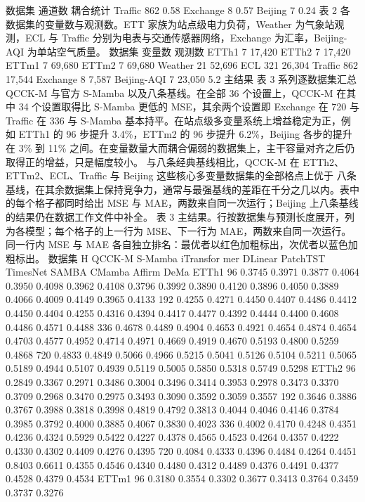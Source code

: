 \documentclass[
]{article}
\begin{document}
数据集 通道数 耦合统计 Traffic 862 0.58 Exchange 8 0.57 Beijing 7 0.24
表 2 各数据集的变量数与观测数。ETT 家族为站点级电力负荷，Weather
为气象站观测，ECL 与 Traffic 分别为电表与交通传感器网络，Exchange
为汇率，Beijing-AQI 为单站空气质量。 数据集 变量数 观测数 ETTh1 7 17,420
ETTh2 7 17,420 ETTm1 7 69,680 ETTm2 7 69,680 Weather 21 52,696 ECL 321
26,304 Traffic 862 17,544 Exchange 8 7,587 Beijing-AQI 7 23,050 5.2
主结果 表 3 系列逐数据集汇总 QCCK-M 与官方 S-Mamba 以及八条基线。在全部
36 个设置上，QCCK-M 在其中 34 个设置取得比 S-Mamba 更低的
MSE，其余两个设置即 Exchange 在 720 与 Traffic 在 336 与 S-Mamba
基本持平。在站点级多变量系统上增益稳定为正，例如 ETTh1 的 96 步提升
3.4\%，ETTm2 的 96 步提升 6.2\%，Beijing 各步的提升在 3\% 到 11\%
之间。在变量数量大而耦合偏弱的数据集上，主干容量对齐之后仍取得正的增益，只是幅度较小。
与八条经典基线相比，QCCK-M 在 ETTh2、ETTm2、ECL、Traffic 与 Beijing
这些核心多变量数据集的全部格点上优于
八条基线，在其余数据集上保持竞争力，通常与最强基线的差距在千分之几以内。表中的每个格子都同时给出
MSE 与 MAE，两数来自同一次运行；Beijing
上八条基线的结果仍在数据工作文件中补全。 表 3
主结果。行按数据集与预测长度展开，列为各模型；每个格子的上一行为
MSE、下一行为 MAE，两数来自同一次运行。同一行内 MSE 与 MAE
各自独立排名：最优者以红色加粗标出，次优者以蓝色加粗标出。 数据集 H
QCCK-M S-Mamba iTransfor mer DLinear PatchTST TimesNet SAMBA CMamba
Affirm DeMa ETTh1 96 0.3745 0.3971 0.3877 0.4064 0.3950 0.4098 0.3962
0.4108 0.3796 0.3992 0.3890 0.4120 0.3896 0.4050 0.3889 0.4066 0.4009
0.4149 0.3965 0.4133 192 0.4255 0.4271 0.4450 0.4407 0.4486 0.4412
0.4450 0.4404 0.4255 0.4316 0.4394 0.4417 0.4477 0.4392 0.4444 0.4400
0.4608 0.4486 0.4571 0.4488 336 0.4678 0.4489 0.4904 0.4653 0.4921
0.4654 0.4874 0.4654 0.4703 0.4577 0.4952 0.4714 0.4971 0.4669 0.4919
0.4670 0.5193 0.4800 0.5259 0.4868 720 0.4833 0.4849 0.5066 0.4966
0.5215 0.5041 0.5126 0.5104 0.5211 0.5065 0.5189 0.4944 0.5107 0.4939
0.5119 0.5005 0.5850 0.5318 0.5749 0.5298 ETTh2 96 0.2849 0.3367 0.2971
0.3486 0.3004 0.3496 0.3414 0.3953 0.2978 0.3473 0.3370 0.3709 0.2968
0.3470 0.2975 0.3493 0.3090 0.3592 0.3059 0.3557 192 0.3646 0.3886
0.3767 0.3988 0.3818 0.3998 0.4819 0.4792 0.3813 0.4044 0.4046 0.4146
0.3784 0.3985 0.3792 0.4000 0.3885 0.4067 0.3830 0.4023 336 0.4002
0.4170 0.4248 0.4351 0.4236 0.4324 0.5929 0.5422 0.4227 0.4378 0.4565
0.4523 0.4264 0.4357 0.4222 0.4330 0.4302 0.4409 0.4276 0.4395 720
0.4084 0.4333 0.4396 0.4484 0.4264 0.4451 0.8403 0.6611 0.4355 0.4546
0.4340 0.4480 0.4312 0.4489 0.4376 0.4491 0.4377 0.4528 0.4379 0.4534
ETTm1 96 0.3180 0.3554 0.3302 0.3677 0.3413 0.3764 0.3459 0.3737 0.3276
\end{document}
